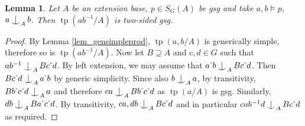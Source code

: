 \documentclass{amsart}
\makeatletter
\numberwithin{equation}{section}
\newtheorem{lemme}[thm]{Lemma}
\theoremstyle{definition}
\theoremstyle{mystyle}
\theoremstyle{remark}
\DeclareMathOperator{\tp}{tp}
\def\indsym#1#2{%
 \setbox0=\hbox{$\m@th#1x$}%
 \kern\wd0%
 \hbox to 0pt{\hss$\m@th#1\mid$\hbox to 0pt{$\m@th#1^{#2}$\hss}\hss}%
 \lower.9\ht0\hbox to 0pt{\hss$\m@th#1\smile$\hss}%
 \kern\wd0}
\newcommand{\ind}[1][]{\mathop{\mathpalette\indsym{#1}}}
\makeatother
\begin{document}
\begin{lemme}\label{lem_bigsgexist}
Let $A$ be an extension base, $p\in S_G(A)$ be gsg and take $a,b\models p$, $a\ind_A b$. Then $\tp(ab^{-1}/A)$ is two-sided gsg.
\end{lemme}
\begin{proof}
By Lemma \ref{lem_gensimpleprod}, $\tp(a,b/A)$ is generically simple, therefore so is $\tp(ab^{-1}/A)$. Now let $B\supseteq A$ and $c,d\in G$ such that $ab^{-1} \ind_A Bc\hat{~}d$. By left extension, we may assume that $a\hat{~}b \ind_A Bc\hat{~}d$. Then $Bc\hat{~}d\ind_A a\hat{~}b$ by generic simplicity. Since also $b\ind_A a$, by transitivity, $Bb\hat{~}c\hat{~}d \ind_A a$ and therefore $c a \ind_A Bb\hat{~}c\hat{~}d$ as $\tp(a/A)$ is gsg. Similarly, $d b \ind_A Ba\hat{~}c\hat{~}d$. By transitivity, $ca,db\ind_A Bc\hat{~}d$ and in particular $cab^{-1}d \ind_A Bc\hat{~}d$ as required.
\end{proof}
\end{document}
